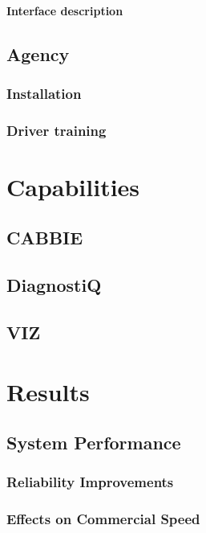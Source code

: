 \documentclass[11pt,letterpaper,]{report}
\begin{document}
\subsubsection{Interface description}

\section{Agency}

\subsection{Installation}

\subsection{Driver training}

\chapter{Capabilities}

\section{CABBIE}

\section{DiagnostiQ}

\section{VIZ}

\chapter{Results}

\section{System Performance}

\subsection{Reliability Improvements}

\subsection{Effects on Commercial Speed}
\end{document}
